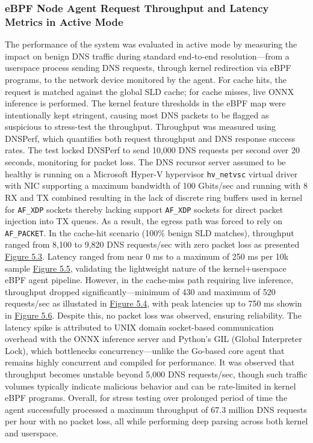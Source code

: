 \documentclass [11pt, proquest] {uwthesis}[2020/02/24]
\begin{document}
\subsubsection{eBPF Node Agent Request Throughput and Latency Metrics in Active Mode}
The performance of the system was evaluated in active mode by measuring the impact on benign DNS traffic during standard end-to-end resolution—from a userspace process sending DNS requests, through kernel redirection via eBPF programs, to the network device monitored by the agent. For cache hits, the request is matched against the global SLD cache; for cache misses, live ONNX inference is performed. The kernel feature thresholds in the eBPF map were intentionally kept stringent, causing most DNS packets to be flagged as suspicious to stress-test the throughput. Throughput was measured using DNSPerf, which quantifies both request throughput and DNS response success rates. The test locked DNSPerf to send 10,000 DNS requests per second over 20 seconds, monitoring for packet loss. The DNS recursor server assumed to be healthy is running on a Microsoft Hyper-V hypervisor \texttt{hv\_netvsc} virtual driver with NIC supporting a maximum bandwidth of 100 Gbits/sec and running with 8 RX and TX combined resulting in the lack of discrete ring buffers used in kernel for \texttt{AF\_XDP} sockets thereby lacking support \texttt{AF\_XDP} sockets for direct packet injection into TX queues. As a result, the egress path was forced to rely on \texttt{AF\_PACKET}. In the cache-hit scenario (100\% benign SLD matches), throughput ranged from 8,100 to 9,820 DNS requests/sec with zero packet loss as presented \hyperref[fig:throughput_gsld]{Figure 5.3}. Latency ranged from near 0 ms to a maximum of 250 ms per 10k sample \hyperlink{fig:latency_gsld}{Figure 5.5}, validating the lightweight nature of the kernel+userspace eBPF agent pipeline. However, in the cache-miss path requiring live inference, throughput dropped significantly—minimum of 430 and maximum of 520 requests/sec as illustated in \hyperref[fig:throughput_onnx]{Figure 5.4}, with peak latencies up to 750 ms showin in \hyperref[fig:latency_onnx]{Figure 5.6}. Despite this, no packet loss was observed, ensuring reliability. The latency spike is attributed to UNIX domain socket-based communication overhead with the ONNX inference server and Python’s GIL (Global Interpreter Lock), which bottlenecks concurrency—unlike the Go-based core agent that remains highly concurrent and compiled for performance.
It was observed that throughput becomes unstable beyond 5,000 DNS requests/sec, though such traffic volumes typically indicate malicious behavior and can be rate-limited in kernel eBPF programs. Overall, for stress testing over prolonged period of time the agent successfully processed a maximum throughput of 67.3 million DNS requests per hour with no packet loss, all while performing deep parsing across both kernel and userspace.
\end{document}
